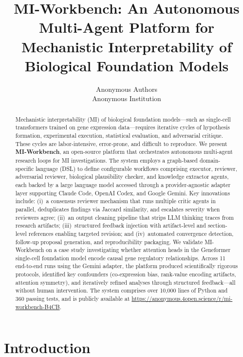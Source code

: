 \documentclass[10pt]{article}
\author{\name Anonymous Authors \\
      \addr Anonymous Institution}
\title{MI-Workbench: An Autonomous Multi-Agent Platform for\\Mechanistic Interpretability of Biological Foundation Models}
\begin{document}
\maketitle

\begin{abstract}
Mechanistic interpretability (MI) of biological foundation models---such as single-cell transformers trained on gene expression data---requires iterative cycles of hypothesis formation, experimental execution, statistical evaluation, and adversarial critique. These cycles are labor-intensive, error-prone, and difficult to reproduce. We present \textbf{MI-Workbench}, an open-source platform that orchestrates autonomous multi-agent research loops for MI investigations. The system employs a graph-based domain-specific language (DSL) to define configurable workflows comprising executor, reviewer, adversarial reviewer, biological plausibility checker, and knowledge extractor agents, each backed by a large language model accessed through a provider-agnostic adapter layer supporting Claude Code, OpenAI Codex, and Google Gemini. Key innovations include: (i)~a consensus reviewer mechanism that runs multiple critic agents in parallel, deduplicates findings via Jaccard similarity, and escalates severity when reviewers agree; (ii)~an output cleaning pipeline that strips LLM thinking traces from research artifacts; (iii)~structured feedback injection with artifact-level and section-level references enabling targeted revision; and (iv)~automated convergence detection, follow-up proposal generation, and reproducibility packaging. We validate MI-Workbench on a case study investigating whether attention heads in the Geneformer single-cell foundation model encode causal gene regulatory relationships. Across 11 end-to-end runs using the Gemini adapter, the platform produced scientifically rigorous protocols, identified key confounders (co-expression bias, rank-value encoding artifacts, attention symmetry), and iteratively refined analyses through structured feedback---all without human intervention. The system comprises over 10,000 lines of Python and 360 passing tests, and is publicly available at \url{https://anonymous.4open.science/r/mi-workbench-B4CB}.
\end{abstract}


\section{Introduction}
\label{sec:introduction}
\end{document}
